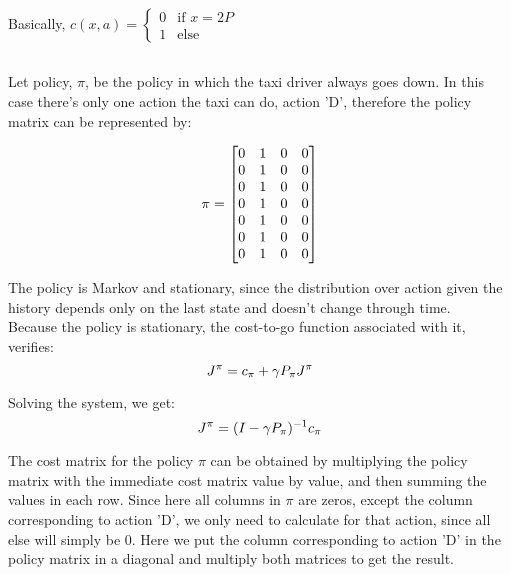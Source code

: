 \documentclass{article}
\begin{document}
\medskip

Basically, $c(x, a) = \left\{\begin{array}{ll}
    0 & \text{if } x = 2P \\
    1 & \text{else}
\end{array}
\right.$

\subsection{}

Let policy, $\pi$, be the policy in which the taxi driver always goes down. In this case there's only one action the taxi can do, action 'D',
therefore the policy matrix can be represented by: 

\begin{equation}
    \notag
    \pi = \begin{bmatrix}
        0 & 1 & 0 & 0 \\
        0 & 1 & 0 & 0 \\
        0 & 1 & 0 & 0 \\
        0 & 1 & 0 & 0 \\
        0 & 1 & 0 & 0 \\
        0 & 1 & 0 & 0 \\
        0 & 1 & 0 & 0 \\
    \end{bmatrix}
\end{equation}

The policy is Markov and stationary, since the distribution over action given the history depends only on the last state and
doesn't change through time. \\

Because the policy is stationary, the cost-to-go function associated with it, verifies:
\begin{equation}
    \notag
    J^\pi = c_\pi + {\gamma}P_{\pi}J^{\pi}
\end{equation}

Solving the system, we get:
\begin{equation}
    \notag
    J^\pi = {(I - {\gamma}P_{\pi})^{-1}}c_\pi
\end{equation}

\medskip

The cost matrix for the policy $\pi$ can be obtained by multiplying the policy matrix with the immediate cost matrix value by value, and then summing the values in each row.
Since here all columns in $\pi$ are zeros, except the column corresponding to action 'D', we only need to calculate for that action, since all else will simply be 0. Here we put the column corresponding to action 'D' in the policy matrix in a diagonal and multiply both matrices to get the result.
\end{document}
